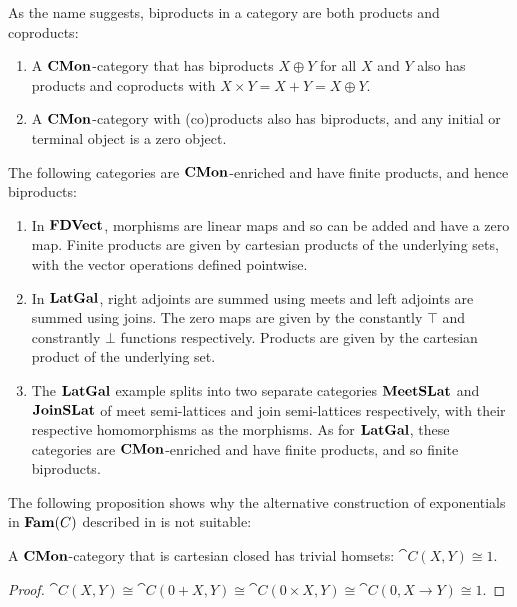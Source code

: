 As the name suggests, biproducts in a category are both products and
coproducts:
\begin{proposition}
  \begin{enumerate}
  \item A $\mathbf{CMon}$-category that has biproducts $X \oplus Y$ for all
    $X$ and $Y$ also has products and coproducts with
    $X \times Y = X + Y = X \oplus Y$.
  \item A $\mathbf{CMon}$-category with (co)products also has biproducts, and
    any initial or terminal object is a zero object.
  \end{enumerate}
\end{proposition}

\begin{example}
  The following categories are $\mathbf{CMon}$-enriched and have finite
  products, and hence biproducts:
  \begin{enumerate}
  \item In $\mathbf{FDVect}$, morphisms are linear maps and so can be added
    and have a zero map. Finite products are given by cartesian
    products of the underlying sets, with the vector operations
    defined pointwise.
  \item In $\mathbf{LatGal}$, right adjoints are summed using meets and left
    adjoints are summed using joins. The zero maps are given by the
    constantly $\top$ and constrantly $\bot$ functions
    respectively. Products are given by the cartesian product of the
    underlying set.
  \item The $\mathbf{LatGal}$ example splits into two separate categories
    $\mathbf{MeetSLat}$ and $\mathbf{JoinSLat}$ of meet semi-lattices and join
    semi-lattices respectively, with their respective homomorphisms as
    the morphisms. As for $\mathbf{LatGal}$, these categories are
    $\mathbf{CMon}$-enriched and have finite products, and so finite
    biproducts.
  \end{enumerate}
\end{example}

The following proposition shows why the alternative construction of
exponentials in $\mathbf{Fam}(C)$ described in 
is not suitable:
\begin{proposition}
  A $\mathbf{CMon}$-category that is cartesian closed has trivial homsets:
  $\cat{C}(X,Y) \cong 1$.
\end{proposition}

\begin{proof}
  $\cat{C}(X, Y) \cong \cat{C}(0 + X,Y) \cong \cat{C}(0 \times X,Y)
  \cong \cat{C}(0,X \to Y) \cong 1$.
\end{proof}

